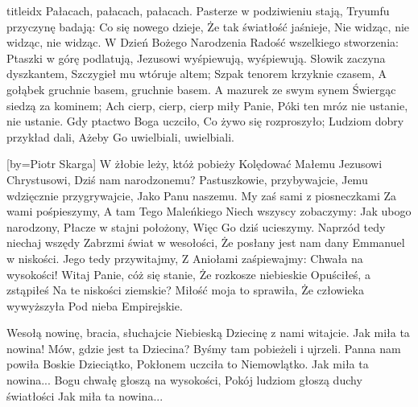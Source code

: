 \documentclass[a5paper, portrait, 12pt]{mwart}
\begin{document}
\begin{songs}{titleidx}
    Pałacach, pałacach, pałacach.
\endchorus
\beginverse
    Pasterze w podziwieniu stają,
    Tryumfu przyczynę badają:
\endverse
\beginchorus
    Co się nowego dzieje,
    Że tak światłość jaśnieje,
    Nie widząc, nie widząc, nie widząc.
\endchorus
\endsong
\beginverse
    W Dzień Bożego Narodzenia
    Radość wszelkiego stworzenia:
    Ptaszki w górę podlatują,
    Jezusowi wyśpiewują, wyśpiewują.
\endverse
\beginverse
    Słowik zaczyna dyszkantem,
    Szczygieł mu wtóruje altem;
    Szpak tenorem krzyknie czasem,
    A gołąbek gruchnie basem, gruchnie basem.
\endverse
\beginverse
    A mazurek ze swym synem
    Świergąc siedzą za kominem;
    Ach cierp, cierp, cierp miły Panie,
    Póki ten mróz nie ustanie, nie ustanie.
\endverse
\beginverse
    Gdy ptactwo Boga uczciło,
    Co żywo się rozproszyło;
    Ludziom dobry przykład dali,
    Ażeby Go uwielbiali, uwielbiali.
\endverse
\endsong

[by={Piotr Skarga}]
\beginverse
    W żłobie leży, któż pobieży
    Kolędować Małemu
    Jezusowi Chrystusowi,
    Dziś nam narodzonemu?
\endverse
\beginchorus
        Pastuszkowie, przybywajcie,
        Jemu wdzięcznie przygrywajcie,
        Jako Panu naszemu.
\endchorus
\beginverse
    My zaś sami z piosneczkami
    Za wami pośpieszymy,
    A tam Tego Maleńkiego
    Niech wszyscy zobaczymy:
\endverse
\beginchorus
        Jak ubogo narodzony,
        Płacze w stajni położony,
        Więc Go dziś ucieszymy.
\endchorus
\beginverse
    Naprzód tedy niechaj wszędy
    Zabrzmi świat w wesołości,
    Że posłany jest nam dany
    Emmanuel w niskości.
\endverse
\beginchorus
        Jego tedy przywitajmy,
        Z Aniołami zaśpiewajmy:
        Chwała na wysokości!
\endchorus
\beginverse
    Witaj Panie, cóż się stanie,
    Że rozkosze niebieskie
    Opuściłeś, a zstąpiłeś
    Na te niskości ziemskie?
\endverse
\beginchorus
        Miłość moja to sprawiła,
        Że człowieka wywyższyła
        Pod nieba Empirejskie.
\endchorus
\endsong

\beginverse
    Wesołą nowinę, bracia, słuchajcie
    Niebieską Dziecinę z nami witajcie.
\endverse
\beginchorus
        Jak miła ta nowina!
        Mów, gdzie jest ta Dziecina?
        Byśmy tam pobieżeli i ujrzeli.
\endchorus
\beginverse
    Panna nam powiła Boskie Dzieciątko,
    Pokłonem uczciła to Niemowlątko.
\endverse
\beginchorus
        Jak miła ta nowina...
\endchorus
\beginverse
    Bogu chwałę głoszą na wysokości,
    Pokój ludziom głoszą duchy światłości
\endverse
\beginchorus
        Jak miła ta nowina...
\endchorus


\end{songs}
\end{document}
